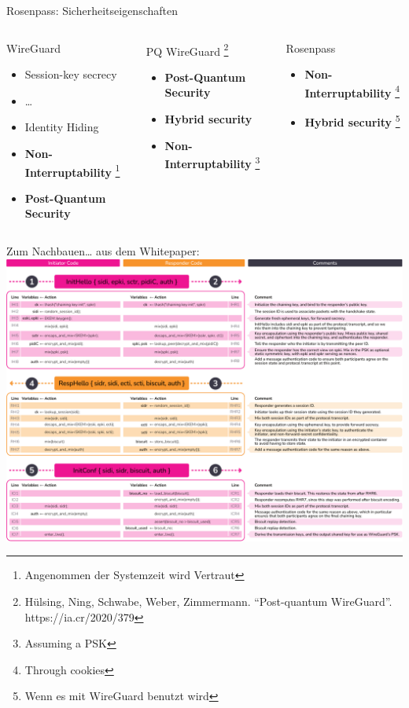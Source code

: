 \documentclass{rosenpass-beamer}
\newcommand*{\heading}[1]{
  {
    \hspace*{-0.5cm}#1
    \vspace{1.0em}
  }
}
\newcommand*\itemtick{\item[\Checkmark]}
\newcommand*\itemfail{\item[\XSolidBrush]}
\begin{document}
\begin{frame}{Rosenpass: Sicherheitseigenschaften}

\vspace{0.5em}
\begin{columns}[t]
\begin{column}{.30\textwidth}
\heading{WireGuard}
\begin{itemize}
  \itemtick Session-key secrecy
  \itemtick \dots
  \itemtick Identity Hiding
  \itemfail \textbf{Non-Interruptability} \footnote[frame]{Angenommen der Systemzeit wird Vertraut}
  \itemfail \textbf{Post-Quantum Security}
\end{itemize}
\end{column}

\begin{column}{.30\textwidth}
\heading{
  PQ WireGuard
  \footnote[frame]{
	  Hülsing, Ning, Schwabe, Weber, Zimmermann. “Post-quantum WireGuard”. https://ia.cr/2020/379
	}
}
\begin{itemize}
  \itemtick \textbf{Post-Quantum Security}
  \itemfail \textbf{Hybrid security}
  \itemfail \textbf{Non-Interruptability} \footnote[frame]{Assuming a PSK}
\end{itemize}
\end{column}

\begin{column}{.30\textwidth}
\heading{Rosenpass}
\begin{itemize}
  \itemtick \textbf{Non-Interruptability} \footnote[frame]{Through cookies}
  \itemtick \textbf{Hybrid security} \footnote[frame]{Wenn es mit WireGuard benutzt wird}
\end{itemize}
\end{column}

\end{columns}
\vspace{1.5em}

\end{frame}

\begin{frame}{Zum Nachbauen… aus dem Whitepaper:}
  \includegraphics[height=.9\textheight]{graphics/rosenpass-wp-message-handling-code.pdf}
\end{frame}
\end{document}
